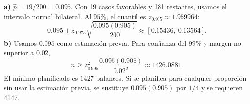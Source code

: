 \textbf{a)} $\hat p=19/200=0.095$. Con 19 casos favorables
y 181 restantes, usamos el intervalo normal bilateral.
Al $95\%$, el cuantil es $z_{0.975}\approx1.959964$:
\[
0.095\pm z_{0.975}\sqrt{\frac{0.095(0.905)}{200}}
\approx\boxed{[0.05436,\ 0.13564]}.
\]
\textbf{b)} Usamos $0.095$ como estimación previa. Para
confianza del $99\%$ y margen no superior a $0.02$,
\[
n\ge z_{0.995}^2\frac{0.095(0.905)}{0.02^2}\approx1426.0881.
\]
El mínimo planificado es $\boxed{1427}$ balances. Si se
planifica para cualquier proporción sin usar la estimación previa,
se sustituye $0.095(0.905)$ por $1/4$ y se requieren 4147.
